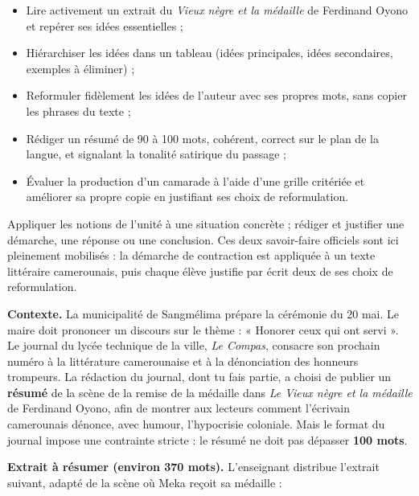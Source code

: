 \documentclass[11pt]{article}
\newcommand{\cle}[1]{{\popxbold\color{popdark}#1}}
\newcounter{popsec}
\newcounter{popsub}
\newcommand{\courssub}[1]{%
  \stepcounter{popsub}%
  \par\vspace{9pt}\noindent{\popxbold\fontsize{11.5}{13}\selectfont\color{popink}{\color{poporange}\thepopsec.\thepopsub}\hspace{6pt}#1}\par\nopagebreak\vspace{4pt}
}
\begin{document}
\begin{itemize}
\item \cle{Lire activement} un extrait du \emph{Vieux nègre et la médaille} de Ferdinand Oyono et repérer ses idées essentielles ;
\item \cle{Hiérarchiser} les idées dans un tableau (idées principales, idées secondaires, exemples à éliminer) ;
\item \cle{Reformuler} fidèlement les idées de l'auteur avec ses propres mots, sans copier les phrases du texte ;
\item \cle{Rédiger} un résumé de 90 à 100 mots, cohérent, correct sur le plan de la langue, et signalant la tonalité satirique du passage ;
\item \cle{Évaluer} la production d'un camarade à l'aide d'une grille critériée et \cle{améliorer} sa propre copie en justifiant ses choix de reformulation.
\end{itemize}

\begin{aretenir}
Appliquer les notions de l'unité à une situation concrète ; rédiger et justifier une démarche, une réponse ou une conclusion. Ces deux savoir-faire officiels sont ici pleinement mobilisés : la démarche de contraction est appliquée à un texte littéraire camerounais, puis chaque élève justifie par écrit deux de ses choix de reformulation.
\end{aretenir}

\courssub{Situation}

\textbf{Contexte.} La municipalité de Sangmélima prépare la cérémonie du 20 mai. Le maire doit prononcer un discours sur le thème : « Honorer ceux qui ont servi ». Le journal du lycée technique de la ville, \emph{Le Compas}, consacre son prochain numéro à la littérature camerounaise et à la dénonciation des honneurs trompeurs. La rédaction du journal, dont tu fais partie, a choisi de publier un \textbf{résumé} de la scène de la remise de la médaille dans \emph{Le Vieux nègre et la médaille} de Ferdinand Oyono, afin de montrer aux lecteurs comment l'écrivain camerounais dénonce, avec humour, l'hypocrisie coloniale. Mais le format du journal impose une contrainte stricte : le résumé ne doit pas dépasser \textbf{100 mots}.

\textbf{Extrait à résumer (environ 370 mots).} L'enseignant distribue l'extrait suivant, adapté de la scène où Meka reçoit sa médaille :
\end{document}

